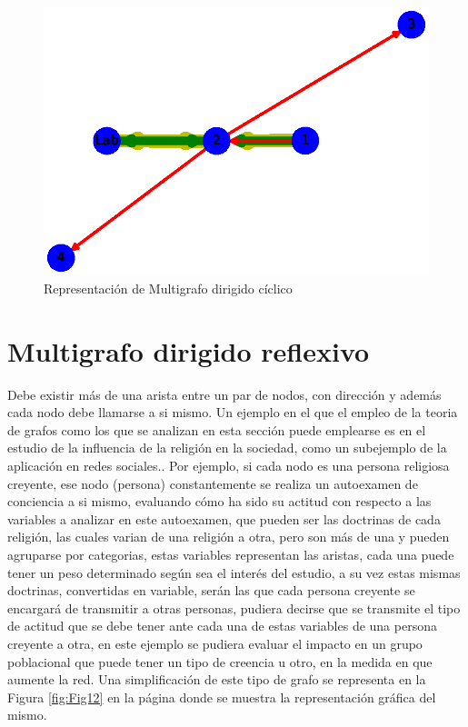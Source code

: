 \documentclass{article}
\begin{document}


\begin{figure}
    \centering
    \includegraphics[scale=0.6]{imagenes/Fig11.eps}
    \caption{Representación de Multigrafo dirigido cíclico}
    \label{fig:Fig11}
\end{figure}

\section{Multigrafo dirigido reflexivo}
Debe existir más de una arista entre un par de nodos, con dirección y además cada nodo debe llamarse a si mismo.
Un ejemplo en el que el empleo de la teoria de grafos como los que se analizan en esta sección puede emplearse es en el estudio de la influencia de la religión en la sociedad, como un subejemplo de la aplicación en redes sociales.\cite{redes}. Por ejemplo, si cada nodo es una persona religiosa creyente, ese nodo (persona) constantemente se realiza un autoexamen de conciencia a si mismo, evaluando cómo ha sido su actitud con respecto a las variables a analizar en este autoexamen, que pueden ser las doctrinas de cada religión, las cuales varian de una religión a otra, pero son más de una y pueden agruparse por categorias, estas variables representan las aristas, cada una puede tener un peso determinado según sea el interés del estudio, a su vez estas mismas doctrinas, convertidas en variable, serán las que cada persona creyente se encargará de transmitir a otras personas, pudiera decirse que se transmite el tipo de actitud que se debe tener ante cada una de estas variables de una persona creyente a otra, en este ejemplo se pudiera evaluar el impacto en un grupo poblacional que puede tener un tipo de creencia u otro, en la medida en que aumente la red. Una simplificación de este tipo de grafo se representa en la Figura \ref{fig:Fig12} en la página \pageref{fig:Fig12} donde se muestra la representación gráfica del mismo. 
\end{document}

